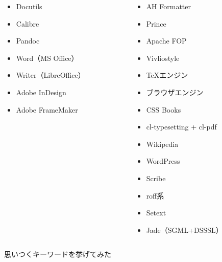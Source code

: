 {\begin{columns}[t]
\begin{column}{.37\textwidth}
\begin{itemize}
      \item {\utility Docutils}
      \item {\utility Calibre}
      \item {\utility Pandoc}

      \item {\wysiwyg Word（MS Office）}
      \item {\wysiwyg Writer（LibreOffice）}
      \item {\wysiwyg Adobe InDesign}
      \item {\wysiwyg Adobe FrameMaker}
    \end{itemize}
    \end{column}
    \begin{column}{.31\textwidth}
    \begin{itemize}
      \item {\formatter AH Formatter}
      \item {\formatter Prince}
      \item {\formatter Apache FOP}

      \item {\formatter Vivliostyle}

      \item {\formatter \TeX エンジン}
      
      \item {\formatter ブラウザエンジン}
      \item {\formatter CSS Books}

      \item {\formatter cl-typesetting + cl-pdf}

      \item {\cms Wikipedia}
      \item {\cms WordPress}

      \item {\historical Scribe}
      \item {\historical roff系}
      \item {\historical Setext}
      \item {\historical Jade（SGML+DSSSL）}
    \end{itemize}
    \end{column}
  \end{columns}
}

\begin{frame}[t]{\inhibitglue 思いつくキーワードを挙げてみた}
  \sffamily
  \documentsystems
  
\end{frame}

